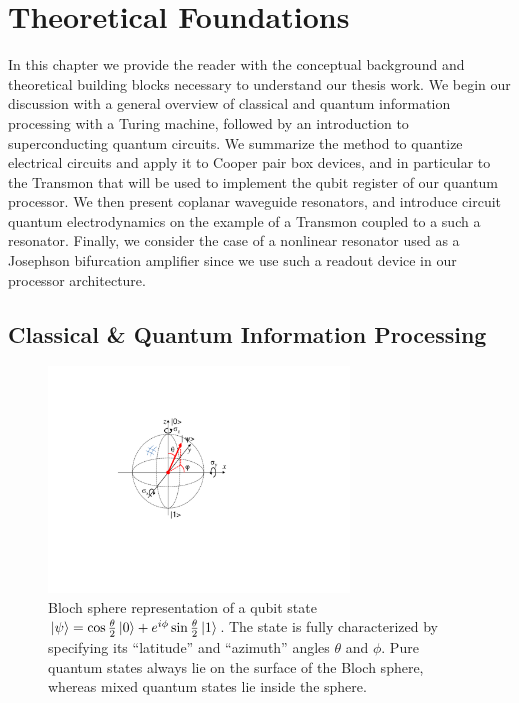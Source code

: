 \chapter{Theoretical Foundations} \label{chapter:theory}

In this chapter we provide the reader with the conceptual background and theoretical building blocks necessary  to understand our thesis work. We begin our discussion with a general overview of classical and quantum information processing with a Turing machine, followed by an introduction to superconducting quantum circuits. We summarize the method to quantize electrical circuits and apply it to Cooper pair box devices, and in particular to the Transmon that will be used to implement the qubit register of our quantum processor. We then present coplanar waveguide resonators, and introduce circuit quantum electrodynamics on the example of a Transmon coupled to a such a resonator. Finally, we consider the case of a nonlinear resonator used as a Josephson bifurcation amplifier since we use such a readout device in our processor architecture.

\section{Classical \& Quantum Information Processing}

\begin{figure}
	\includegraphics[width=8cm]{"./material/figures/introduction/bloch_sphere"}
	\caption{Bloch sphere representation of a qubit state $\left| \psi \right> = \cos{\frac{\theta}{2}}\left| 0 \right>+e^{i\phi}\sin{\frac{\theta}{2}}\left| 1 \right>$. The state is fully characterized by specifying its ``latitude'' and ``azimuth'' angles $\theta$ and $\phi$. Pure quantum states always lie on the surface of the Bloch sphere, whereas mixed quantum states lie inside the sphere.}
	\label{fig:BlochSphere}
\end{figure}

